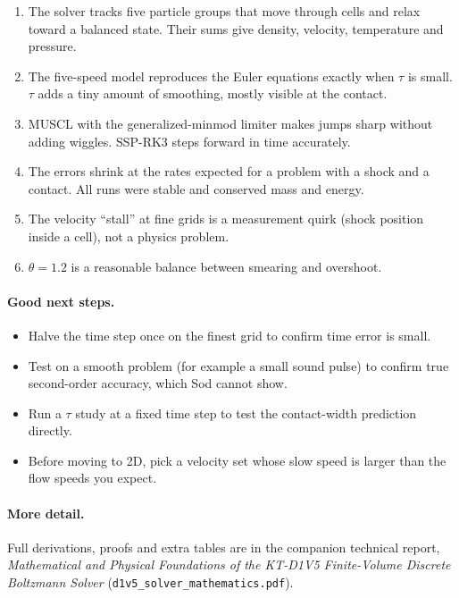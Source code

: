 \documentclass[11pt]{article}
\begin{document}
\begin{enumerate}
  \item The solver tracks five particle groups that move through cells and relax
        toward a balanced state.  Their sums give density, velocity, temperature
        and pressure.
  \item The five-speed model reproduces the Euler equations exactly when $\tau$ is
        small.  $\tau$ adds a tiny amount of smoothing, mostly visible at the
        contact.
  \item MUSCL with the generalized-minmod limiter makes jumps sharp without adding
        wiggles.  SSP-RK3 steps forward in time accurately.
  \item The errors shrink at the rates expected for a problem with a shock and a
        contact.  All runs were stable and conserved mass and energy.
  \item The velocity ``stall'' at fine grids is a measurement quirk (shock position
        inside a cell), not a physics problem.
  \item $\theta = 1.2$ is a reasonable balance between smearing and overshoot.
\end{enumerate}

\paragraph{Good next steps.}
\begin{itemize}
  \item Halve the time step once on the finest grid to confirm time error is small.
  \item Test on a smooth problem (for example a small sound pulse) to confirm true
        second-order accuracy, which Sod cannot show.
  \item Run a $\tau$ study at a fixed time step to test the contact-width
        prediction directly.
  \item Before moving to 2D, pick a velocity set whose slow speed is larger than the
        flow speeds you expect.
\end{itemize}

\paragraph{More detail.}  Full derivations, proofs and extra tables are in the
companion technical report, \emph{Mathematical and Physical Foundations of the
KT-D1V5 Finite-Volume Discrete Boltzmann Solver} (\texttt{d1v5\_solver\_mathematics.pdf}).
\end{document}

